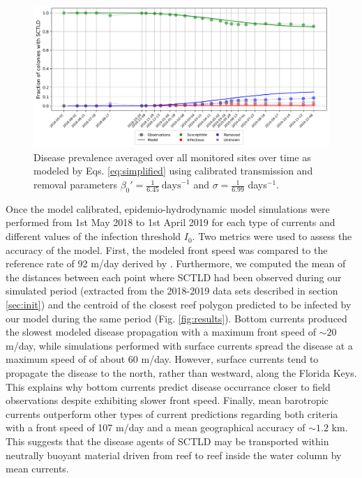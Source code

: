 \documentclass[utf8]{frontiersSCNS}
\begin{document}
\begin{figure}
    \centering
    \includegraphics[width=.95\textwidth]{figures/sir_obs.png}
    \caption{Disease prevalence averaged over all monitored sites over time as modeled by Eqs. \ref{eq:simplified} using calibrated transmission and removal parameters $\beta_0'=\frac{1}{6.45}~\text{days}^{-1}$ and $\sigma=\frac{1}{6.99}$ days$^{-1}$.}
    \label{fig:calibration}
\end{figure}

Once the model calibrated, epidemio-hydrodynamic model simulations were performed from 1st May 2018 to 1st April 2019 for each type of currents and different values of the infection threshold $I_0$. Two metrics were used to assess the accuracy of the model. First, the modeled front speed was compared to the reference rate of 92 m/day derived by \cite{muller2020spatial}. Furthermore, we computed the mean of the distances between each point where SCTLD had been observed during our simulated period (extracted from the 2018-2019 data sets described in section \ref{sec:init}) and the centroid of the closest reef polygon predicted to be infected by our model during the same period (Fig. \ref{fig:results}). Bottom currents produced the slowest modeled disease propagation with a maximum front speed of $\sim 20$ m/day, while simulations performed with surface currents spread the disease at a maximum speed of of about 60 m/day. However, surface currents tend to propagate the disease to the north, rather than westward, along the Florida Keys. This explains why bottom currents predict disease occurrance closer to field observations despite exhibiting slower front speed. Finally, mean barotropic currents outperform other types of current predictions regarding both criteria with a front speed of 107 m/day and a mean geographical accuracy of $\sim1.2$ km. This suggests that the disease agents of SCTLD may be transported within neutrally buoyant material driven from reef to reef inside the water column by mean currents.
\end{document}
